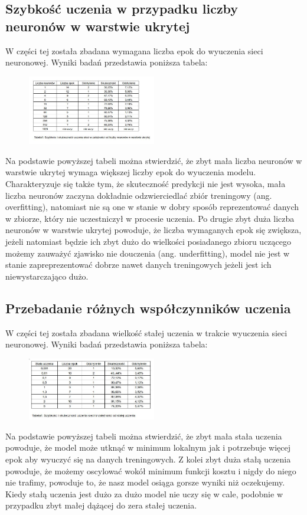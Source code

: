 \documentclass{article}
\begin{document}
	\subsection{Szybkość uczenia w przypadku liczby neuronów w warstwie ukrytej}
	W części tej została zbadana wymagana liczba epok do wyuczenia sieci neuronowej. Wyniki badań przedstawia poniższa tabela:
	
	\begin{figure}[h]
		\centering
		\caption{}
		\includegraphics[width=0.5\textwidth]{tabela_liczba_neuronow.jpg}
	\end{figure}	 
	Na podstawie powyższej tabeli można stwierdzić, że zbyt mała liczba neuronów w warstwie ukrytej wymaga większej liczby epok do wyuczenia modelu. Charakteryzuje się także tym, że skuteczność predykcji nie jest wysoka, mała liczba neuronów zaczyna dokładnie odzwierciedlać zbiór treningowy (ang. overfitting), natomiast nie są one w stanie w dobry sposób reprezentować danych w zbiorze, który nie uczestniczył w procesie uczenia. Po drugie zbyt duża liczba neuronów w warstwie ukrytej powoduje, że liczba wymaganych epok się zwiększa, jeżeli natomiast będzie ich zbyt dużo do wielkości posiadanego zbioru uczącego możemy zauważyć zjawisko nie douczenia (ang. underfitting), model nie jest w stanie zapreprezentować dobrze nawet danych treningowych jeżeli jest ich niewystarczająco dużo.
	
	\subsection{Przebadanie różnych współczynników uczenia}
	W części tej została zbadana wielkość stałej uczenia w trakcie wyuczenia sieci neuronowej. Wyniki badań przedstawia poniższa tabela:
	
	\begin{figure}[h]
		\centering
		\caption{}
		\includegraphics[width=0.5\textwidth]{tabela_stala_uczenia.jpg}
	\end{figure}	 
	Na podstawie powyższej tabeli można stwierdzić, że zbyt mała stała uczenia powoduje, że model może utknąć w minimum lokalnym jak i potrzebuje więcej epok aby wyuczyć się na danych treningowych. Z kolei zbyt duża stałą uczenia powoduje, że możemy oscylować wokół minimum funkcji kosztu i nigdy do niego nie trafimy, powoduje to, że nasz model osiąga gorsze wyniki niż oczekujemy. Kiedy stałą uczenia jest dużo za dużo model nie uczy się w cale, podobnie w przypadku zbyt małej dążącej do zera stałej uczenia.
	
\end{document}
